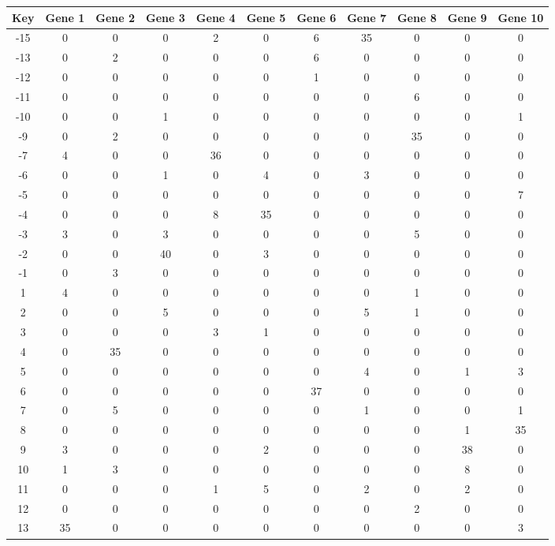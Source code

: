 \begin{tabular}{|c|c|c|c|c|c|c|c|c|c|c|}
\hline
Key & Gene 1 & Gene 2 & Gene 3 & Gene 4 & Gene 5 & Gene 6 & Gene 7 & Gene 8 & Gene 9 & Gene 10 \\
\hline
-15 & 0 & 0 & 0 & 2 & 0 & 6 & 35 & 0 & 0 & 0 \\
-13 & 0 & 2 & 0 & 0 & 0 & 6 & 0 & 0 & 0 & 0 \\
-12 & 0 & 0 & 0 & 0 & 0 & 1 & 0 & 0 & 0 & 0 \\
-11 & 0 & 0 & 0 & 0 & 0 & 0 & 0 & 6 & 0 & 0 \\
-10 & 0 & 0 & 1 & 0 & 0 & 0 & 0 & 0 & 0 & 1 \\
-9 & 0 & 2 & 0 & 0 & 0 & 0 & 0 & 35 & 0 & 0 \\
-7 & 4 & 0 & 0 & 36 & 0 & 0 & 0 & 0 & 0 & 0 \\
-6 & 0 & 0 & 1 & 0 & 4 & 0 & 3 & 0 & 0 & 0 \\
-5 & 0 & 0 & 0 & 0 & 0 & 0 & 0 & 0 & 0 & 7 \\
-4 & 0 & 0 & 0 & 8 & 35 & 0 & 0 & 0 & 0 & 0 \\
-3 & 3 & 0 & 3 & 0 & 0 & 0 & 0 & 5 & 0 & 0 \\
-2 & 0 & 0 & 40 & 0 & 3 & 0 & 0 & 0 & 0 & 0 \\
-1 & 0 & 3 & 0 & 0 & 0 & 0 & 0 & 0 & 0 & 0 \\
1 & 4 & 0 & 0 & 0 & 0 & 0 & 0 & 1 & 0 & 0 \\
2 & 0 & 0 & 5 & 0 & 0 & 0 & 5 & 1 & 0 & 0 \\
3 & 0 & 0 & 0 & 3 & 1 & 0 & 0 & 0 & 0 & 0 \\
4 & 0 & 35 & 0 & 0 & 0 & 0 & 0 & 0 & 0 & 0 \\
5 & 0 & 0 & 0 & 0 & 0 & 0 & 4 & 0 & 1 & 3 \\
6 & 0 & 0 & 0 & 0 & 0 & 37 & 0 & 0 & 0 & 0 \\
7 & 0 & 5 & 0 & 0 & 0 & 0 & 1 & 0 & 0 & 1 \\
8 & 0 & 0 & 0 & 0 & 0 & 0 & 0 & 0 & 1 & 35 \\
9 & 3 & 0 & 0 & 0 & 2 & 0 & 0 & 0 & 38 & 0 \\
10 & 1 & 3 & 0 & 0 & 0 & 0 & 0 & 0 & 8 & 0 \\
11 & 0 & 0 & 0 & 1 & 5 & 0 & 2 & 0 & 2 & 0 \\
12 & 0 & 0 & 0 & 0 & 0 & 0 & 0 & 2 & 0 & 0 \\
13 & 35 & 0 & 0 & 0 & 0 & 0 & 0 & 0 & 0 & 3 \\
\hline
\end{tabular}